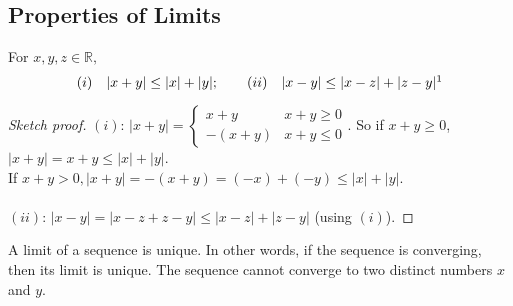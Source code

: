 \documentclass[12pt]{article}
\begin{document}
\subsection{Properties of Limits}
\begin{lemma}\label{lemma:triangleneq}
  For $x,y,z \in \mathbb{R},$
  \[(i)\quad|x + y|  \leq |x| + |y|; \qquad (ii) \quad|x-y| \leq |x-z| + |z-y|\footnotemark\]
\end{lemma}



\begin{proof}[Sketch proof]
  $(i)$:
  $|x+y| = \begin{cases}
    x + y & x + y \geq 0\\
    -(x+y) & x + y \leq 0
  \end{cases}$.
  So if $x + y \geq 0$, $|x+y| = x + y \leq |x| + |y|$. \\
  If $x+y >0, |x+y| = -(x+y) = (-x) + (-y) \leq |x| + |y|$.\\\\
  $(ii)$: $|x-y| = |x-z + z - y| \leq |x-z| + |z-y|$ (using $(i)$).
\end{proof}




\begin{theorem}[$\textcolor{red}{\star}$]
  A limit of a sequence is unique. In other words, if the sequence is converging, then its limit is unique. The sequence cannot converge to two distinct numbers $x$ and $y$.\footnotemark
\end{theorem}
\end{document}
